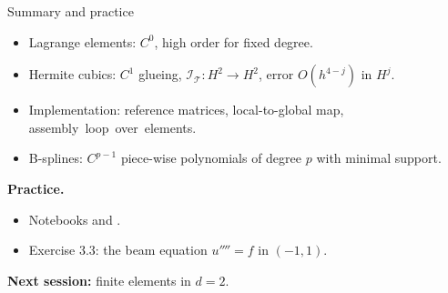 \begin{frame}{Summary and practice}
    \begin{itemize}
        \item Lagrange elements: $C^0$, high order for fixed degree.
        \item Hermite cubics: $C^1$ glueing, $\mathcal I_{\mathcal T}: H^2 \to H^2$, error $O(h^{4-j})$ in $H^j$.
        \item Implementation: reference matrices, local-to-global map, \mbox{assembly loop over elements.}
        \item B-splines: $C^{p-1}$ piece-wise polynomials of degree $p$ with minimal support.
    \end{itemize}
    \bigskip
    \textbf{Practice.}
    \begin{itemize}
        \item Notebooks  and .
        \item Exercise 3.3: the beam equation $u'''' = f$ in $(-1,1)$.
    \end{itemize}
    \bigskip
    \textbf{Next session:} finite elements in $d = 2$.
\end{frame}
